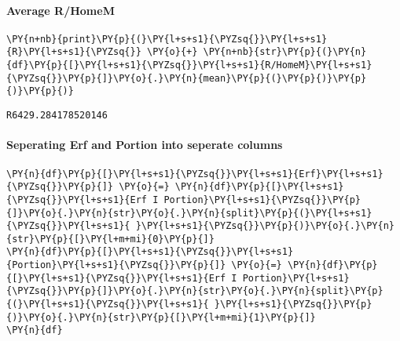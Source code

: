     \hypertarget{average-rhomem}{%
\paragraph{Average R/HomeM}\label{average-rhomem}}

    \begin{tcolorbox}[breakable, size=fbox, boxrule=1pt, pad at break*=1mm,colback=cellbackground, colframe=cellborder]
\begin{Verbatim}[commandchars=\\\{\}]
\PY{n+nb}{print}\PY{p}{(}\PY{l+s+s1}{\PYZsq{}}\PY{l+s+s1}{R}\PY{l+s+s1}{\PYZsq{}} \PY{o}{+} \PY{n+nb}{str}\PY{p}{(}\PY{n}{df}\PY{p}{[}\PY{l+s+s1}{\PYZsq{}}\PY{l+s+s1}{R/HomeM}\PY{l+s+s1}{\PYZsq{}}\PY{p}{]}\PY{o}{.}\PY{n}{mean}\PY{p}{(}\PY{p}{)}\PY{p}{)}\PY{p}{)} 
\end{Verbatim}
\end{tcolorbox}

    \begin{Verbatim}[commandchars=\\\{\}]
R6429.284178520146
    \end{Verbatim}

    \hypertarget{seperating-erf-and-portion-into-seperate-columns}{%
\paragraph{Seperating Erf and Portion into seperate
columns}\label{seperating-erf-and-portion-into-seperate-columns}}

    \begin{tcolorbox}[breakable, size=fbox, boxrule=1pt, pad at break*=1mm,colback=cellbackground, colframe=cellborder]
\begin{Verbatim}[commandchars=\\\{\}]
\PY{n}{df}\PY{p}{[}\PY{l+s+s1}{\PYZsq{}}\PY{l+s+s1}{Erf}\PY{l+s+s1}{\PYZsq{}}\PY{p}{]} \PY{o}{=} \PY{n}{df}\PY{p}{[}\PY{l+s+s1}{\PYZsq{}}\PY{l+s+s1}{Erf I Portion}\PY{l+s+s1}{\PYZsq{}}\PY{p}{]}\PY{o}{.}\PY{n}{str}\PY{o}{.}\PY{n}{split}\PY{p}{(}\PY{l+s+s1}{\PYZsq{}}\PY{l+s+s1}{ }\PY{l+s+s1}{\PYZsq{}}\PY{p}{)}\PY{o}{.}\PY{n}{str}\PY{p}{[}\PY{l+m+mi}{0}\PY{p}{]}
\PY{n}{df}\PY{p}{[}\PY{l+s+s1}{\PYZsq{}}\PY{l+s+s1}{Portion}\PY{l+s+s1}{\PYZsq{}}\PY{p}{]} \PY{o}{=} \PY{n}{df}\PY{p}{[}\PY{l+s+s1}{\PYZsq{}}\PY{l+s+s1}{Erf I Portion}\PY{l+s+s1}{\PYZsq{}}\PY{p}{]}\PY{o}{.}\PY{n}{str}\PY{o}{.}\PY{n}{split}\PY{p}{(}\PY{l+s+s1}{\PYZsq{}}\PY{l+s+s1}{ }\PY{l+s+s1}{\PYZsq{}}\PY{p}{)}\PY{o}{.}\PY{n}{str}\PY{p}{[}\PY{l+m+mi}{1}\PY{p}{]}
\PY{n}{df}
\end{Verbatim}
\end{tcolorbox}

